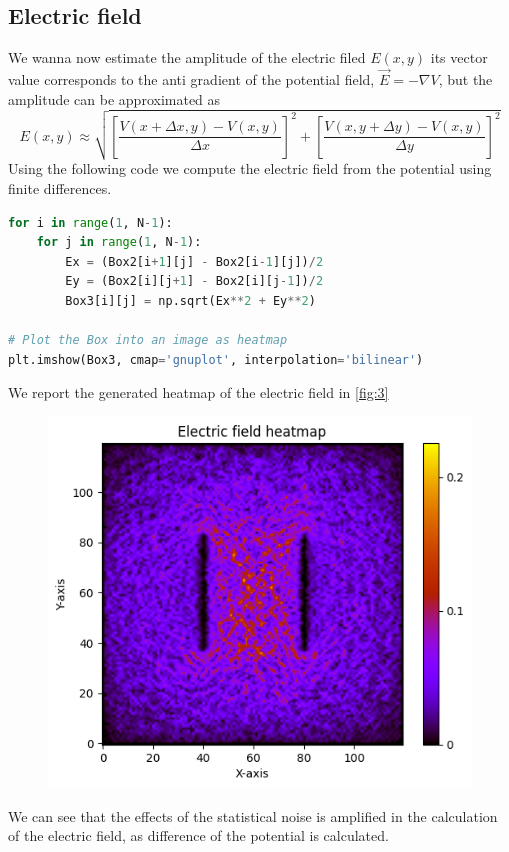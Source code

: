 \documentclass{article}
\begin{document}
\subsection{Electric field}
We wanna now estimate the amplitude of the electric filed $E(x,y)$ its vector value corresponds to the anti gradient of the potential field, $\Vec{E}=-\nabla V$, but the amplitude can be approximated as 
\begin{equation}
    E(x,y)\approx\sqrt{\left[\frac{V(x+\Delta x,y)-V(x,y)}{\Delta x}\right]^2+\left[\frac{V(x,y+\Delta y)-V(x,y)}{\Delta y}\right]^2}
\end{equation}
\noindent Using the following code we compute the electric field from the potential using finite differences.
\begin{lstlisting}[language=Python]
for i in range(1, N-1):
    for j in range(1, N-1):
        Ex = (Box2[i+1][j] - Box2[i-1][j])/2
        Ey = (Box2[i][j+1] - Box2[i][j-1])/2
        Box3[i][j] = np.sqrt(Ex**2 + Ey**2)

# Plot the Box into an image as heatmap
plt.imshow(Box3, cmap='gnuplot', interpolation='bilinear')
\end{lstlisting}
We report the generated heatmap of the electric field in \autoref{fig:3}
\begin{figure}[H]
    \centering
    \includegraphics[width=.7\linewidth]{images/Figure3.png}
    \caption{}
    \label{fig:3}
\end{figure}
\noindent We can see that the effects of the statistical noise is amplified in the calculation of the electric field, as difference of the potential is calculated.
\end{document}
